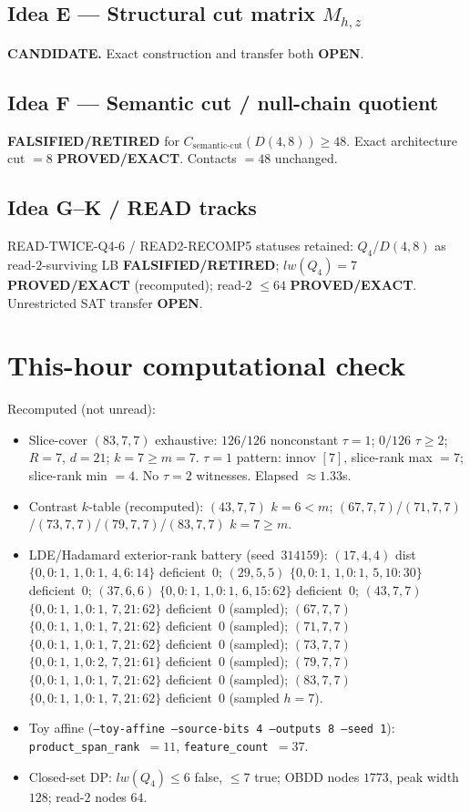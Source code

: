 \documentclass[11pt]{article}
\begin{document}
\subsection*{Idea E --- Structural cut matrix $M_{h,z}$}
\textbf{CANDIDATE.} Exact construction and transfer both \textbf{OPEN}.

\subsection*{Idea F --- Semantic cut / null-chain quotient}
\textbf{FALSIFIED/RETIRED} for $C_{\mathrm{semantic\textrm{-}cut}}(D(4,8))\ge48$.
Exact architecture cut $=8$ \textbf{PROVED/EXACT}. Contacts $=48$ unchanged.

\subsection*{Idea G--K / READ tracks}
READ-TWICE-Q4-6 / READ2-RECOMP5 statuses retained: $Q_4$/$D(4,8)$ as read-$2$-surviving LB
\textbf{FALSIFIED/RETIRED}; $lw(Q_4)=7$ \textbf{PROVED/EXACT} (recomputed); read-$2$ $\le64$
\textbf{PROVED/EXACT}. Unrestricted SAT transfer \textbf{OPEN}.

\section*{This-hour computational check}
Recomputed (not unread):
\begin{itemize}
\item Slice-cover $(83,7,7)$ exhaustive: $126/126$ nonconstant $\tau{=}1$;
  $0/126$ $\tau{\ge}2$; $R{=}7$, $d{=}21$; $k{=}7{\ge}m{=}7$.
  $\tau{=}1$ pattern: innov $[7]$, slice-rank max $=7$; slice-rank min $=4$.
  No $\tau{=}2$ witnesses. Elapsed $\approx1.33$s.
\item Contrast $k$-table (recomputed): $(43,7,7)$ $k{=}6{<}m$;
  $(67,7,7)$/$(71,7,7)$/$(73,7,7)$/$(79,7,7)$/$(83,7,7)$ $k{=}7{\ge}m$.
\item LDE/Hadamard exterior-rank battery (seed~$314159$):
  $(17,4,4)$ dist $\{0,0{:}1,\,1,0{:}1,\,4,6{:}14\}$ deficient~$0$;
  $(29,5,5)$ $\{0,0{:}1,\,1,0{:}1,\,5,10{:}30\}$ deficient~$0$;
  $(37,6,6)$ $\{0,0{:}1,\,1,0{:}1,\,6,15{:}62\}$ deficient~$0$;
  $(43,7,7)$ $\{0,0{:}1,\,1,0{:}1,\,7,21{:}62\}$ deficient~$0$ (sampled);
  $(67,7,7)$ $\{0,0{:}1,\,1,0{:}1,\,7,21{:}62\}$ deficient~$0$ (sampled);
  $(71,7,7)$ $\{0,0{:}1,\,1,0{:}1,\,7,21{:}62\}$ deficient~$0$ (sampled);
  $(73,7,7)$ $\{0,0{:}1,\,1,0{:}2,\,7,21{:}61\}$ deficient~$0$ (sampled);
  $(79,7,7)$ $\{0,0{:}1,\,1,0{:}1,\,7,21{:}62\}$ deficient~$0$ (sampled);
  $(83,7,7)$ $\{0,0{:}1,\,1,0{:}1,\,7,21{:}62\}$ deficient~$0$ (sampled $h{=}7$).
\item Toy affine (\texttt{--toy-affine --source-bits 4 --outputs 8 --seed 1}):
  \texttt{product\_span\_rank}~$=11$, \texttt{feature\_count}~$=37$.
\item Closed-set DP: $lw(Q_4)\le6$ false, $\le7$ true; OBDD nodes $1773$, peak width $128$;
  read-$2$ nodes $64$.
\end{itemize}
\end{document}
